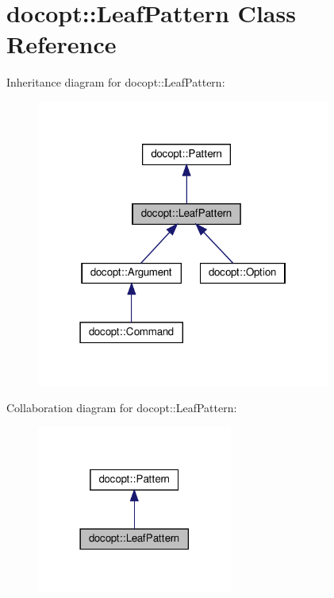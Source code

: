 \hypertarget{classdocopt_1_1LeafPattern}{}\section{docopt\+:\+:Leaf\+Pattern Class Reference}
\label{classdocopt_1_1LeafPattern}


Inheritance diagram for docopt\+:\+:Leaf\+Pattern\+:
\nopagebreak
\begin{figure}[H]
\begin{center}
\leavevmode
\includegraphics[width=274pt]{classdocopt_1_1LeafPattern__inherit__graph}
\end{center}
\end{figure}


Collaboration diagram for docopt\+:\+:Leaf\+Pattern\+:
\nopagebreak
\begin{figure}[H]
\begin{center}
\leavevmode
\includegraphics[width=182pt]{classdocopt_1_1LeafPattern__coll__graph}
\end{center}
\end{figure}
